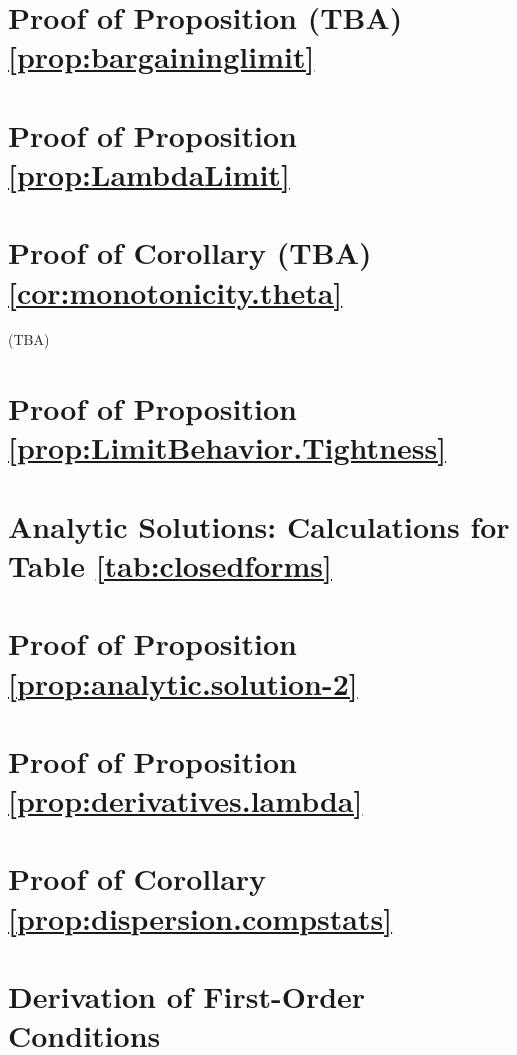 

\section{Proof of Proposition (TBA) \ref{prop:bargaininglimit}}



\section{Proof of Proposition \ref{prop:LambdaLimit}}



\section{Proof of Corollary  (TBA) \ref{cor:monotonicity.theta}}
{\color{red}(TBA)}
% 

\section{Proof of Proposition \ref{prop:LimitBehavior.Tightness}}



\section{Analytic Solutions: Calculations for Table \ref{tab:closedforms}}



\section{Proof of Proposition \ref{prop:analytic.solution-2}}





\section{Proof of Proposition \ref{prop:derivatives.lambda}}




\section{Proof of Corollary \ref{prop:dispersion.compstats}}



\section{Derivation of First-Order Conditions}